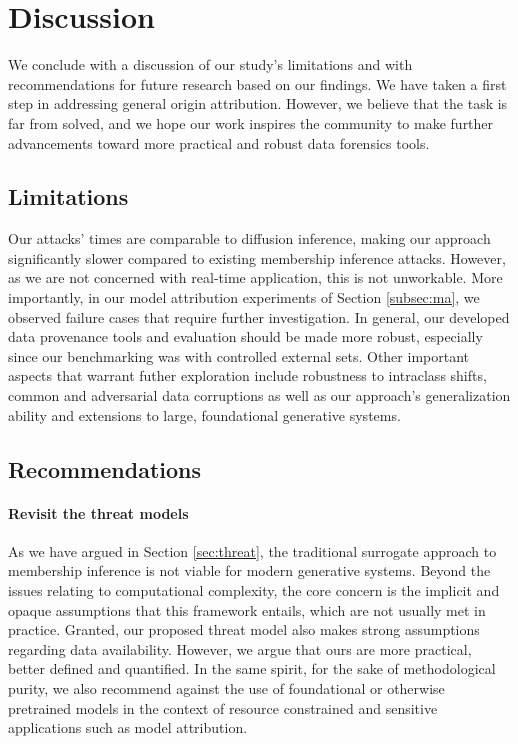\documentclass{article}
\theoremstyle{remark}
\begin{document}
\section{Discussion}
\label{sec:discussion}

We conclude with a discussion of our study's limitations and with recommendations for future research based on our findings. We have taken a first step in addressing general origin attribution. However, we believe that the task is far from solved, and we hope our work inspires the community to make further advancements toward more practical and robust data forensics tools.

\subsection{Limitations}
\label{subsec:limitations}

Our attacks’ times are comparable to diffusion inference, making our approach significantly slower compared to existing membership inference attacks. However, as we are not concerned with real-time application, this is not unworkable. More importantly, in our model attribution experiments of Section \ref{subsec:ma}, we observed failure cases that require further investigation. In general, our developed data provenance tools and evaluation should be made more robust, especially since our benchmarking was with controlled external sets. Other important aspects that warrant futher exploration include robustness to intraclass shifts, common and adversarial data corruptions as well as our approach's generalization ability and extensions to large, foundational generative systems.

\subsection{Recommendations}

\paragraph{Revisit the threat models} As we have argued in Section \ref{sec:threat}, the traditional surrogate approach to membership inference \citep{7958568} is not viable for modern generative systems. Beyond the issues relating to computational complexity, the core concern is the implicit and opaque assumptions that this framework entails, which are not usually met in practice. Granted, our proposed threat model also makes strong assumptions regarding data availability. However, we argue that ours are more practical, better defined and quantified. In the same spirit, for the sake of methodological purity, we also recommend against the use of foundational or otherwise pretrained models in the context of resource constrained and sensitive applications such as model attribution.
\end{document}
